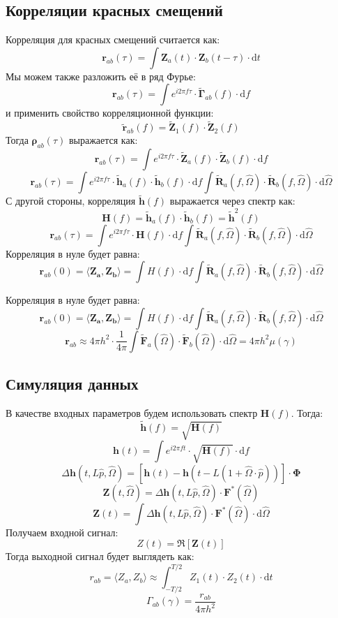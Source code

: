 \subsection{Корреляции красных смещений}
Корреляция для красных смещений считается как:
$$ \mathbf{r}_{ab} (\tau) = \int \mathbf{Z}_a(t) \cdot \mathbf{Z}_b(t - \tau) \cdot \mathrm{d} t $$
Мы можем также разложить её в ряд Фурье:
$$ \mathbf{r}_{ab} (\tau) = \int e^{i 2 \pi f \tau} \cdot \tilde{\mathbf{\Gamma}}_{ab}(f) \cdot \mathrm{d} f $$
и применить свойство корреляционной функции:
$$\tilde{\mathbf{r}}_{ab}(f) = \tilde{\mathbf{Z}}_1(f) \cdot \tilde{\mathbf{Z}}_{2}(f)$$
Тогда $\mathbf{\rho}_{ab}(\tau)$ выражается как:
$$ \mathbf{r}_{ab} (\tau) = \int e^{i 2 \pi f \tau} \cdot \tilde{\mathbf{Z}}_a(f) \cdot \tilde{\mathbf{Z}}_{b}(f) \cdot \mathrm{d} f$$
$$ \mathbf{r}_{ab} (\tau) = \int e^{i 2 \pi f \tau} \cdot \tilde{\mathbf{h}}_a(f) \cdot  \tilde{\mathbf{h}}_b(f)  \cdot \mathrm{d} f \int  \tilde{\mathbf{R}}_a(f, \hat{\Omega})  \cdot \tilde{\mathbf{R}}_b(f, \hat{\Omega}) \cdot \mathrm{d} \hat{\Omega} $$
С другой стороны, корреляция $\tilde{\mathbf{h}}(f)$ выражается через спектр как:
$$ \mathbf{H}(f) = \tilde{\mathbf{h}}_a(f) \cdot \tilde{\mathbf{h}}_b(f) = \tilde{\mathbf{h}}^2(f)$$
$$ \mathbf{r}_{ab} (\tau) = \int e^{i 2 \pi f \tau} \cdot \mathbf{H}(f) \cdot \mathrm{d} f \int  \tilde{\mathbf{R}}_a(f, \hat{\Omega})  \cdot \tilde{\mathbf{R}}_b(f, \hat{\Omega}) \cdot \mathrm{d} \hat{\Omega} $$
Корреляция в нуле будет равна:
$$\mathbf{r}_{ab} (0) = \langle \mathbf{Z_a} ,\mathbf{Z_b} \rangle = \int H(f) \cdot \mathrm{d} f \int  \tilde{\mathbf{R}}_a(f, \hat{\Omega})  \cdot \tilde{\mathbf{R}}_b(f, \hat{\Omega}) \cdot \mathrm{d} \hat{\Omega} $$

Корреляция в нуле будет равна:
$$\mathbf{r}_{ab} (0) = \langle \mathbf{Z_a} ,\mathbf{Z_b} \rangle = \int H(f) \cdot \mathrm{d} f \int  \tilde{\mathbf{R}}_a(f, \hat{\Omega})  \cdot \tilde{\mathbf{R}}_b(f, \hat{\Omega}) \cdot \mathrm{d} \hat{\Omega} $$
$$\mathbf{r}_{ab} \approx 4 \pi h^2 \cdot \frac{1}{4 \pi}\int \tilde{\mathbf{F}}_a(\hat{\Omega})  \cdot \tilde{\mathbf{F}}_b(\hat{\Omega}) \cdot \mathrm{d} \hat{\Omega} = 4 \pi h^2 \mu(\gamma)$$


\subsection{Симуляция данных}

В качестве входных параметров будем использовать спектр $\mathbf{H}(f)$.
Тогда:
$$\tilde{\mathbf{h}}(f) = \sqrt{\mathbf{H}(f)}$$
$$\mathbf{h}(t) = \int e^{i 2 \pi f t} \cdot \sqrt{\mathbf{H}(f)}\cdot \mathrm{d} f$$
$$\Delta \mathbf{h}(t, L\hat{p},  \hat{\Omega}) = \left[ \mathbf{h}(t) - \mathbf{h}(t - L (1 + \hat{\Omega} \cdot \hat{p})) \right] \cdot \mathbf{\Phi}$$
$$\mathbf{Z}(t, \hat{\Omega}) = \Delta \mathbf{h}(t, L\hat{p}, \hat{\Omega}) \cdot \mathbf{F}^{*}(\hat{\Omega})$$
$$\mathbf{Z}(t) = \int   \Delta \mathbf{h}(t, L\hat{p}, \hat{\Omega}) \cdot \mathbf{F}^{*}(\hat{\Omega}) \cdot \mathrm{d} \hat{\Omega}$$
Получаем входной сигнал:
$$Z(t) = \mathfrak{R}\left[\mathbf{Z}(t)\right]$$
Тогда выходной сигнал будет выглядеть как:
$$r_{ab} = \langle Z_a , Z_b \rangle \approx \int_{-T/2}^{T/2} Z_1(t) \cdot Z_2(t) \cdot \mathrm{d} t$$
$$\Gamma_{ab}(\gamma) = \frac{r_{ab}}{4\pi h^2}$$

